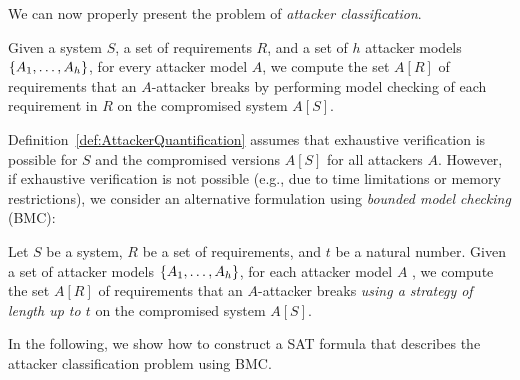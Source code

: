We can now properly present the problem of \emph{attacker classification}.
\begin{definition} 
\label{def:AttackerQuantification}
Given a system $S$, a set of requirements $R$, and a set of $h$ attacker models
$\left\{A_1, \ldots , A_h\right\}$, for every attacker model $A$, we compute the set $A[R]$ of requirements that an $A$-attacker breaks by performing model checking of each requirement in $R$ on the compromised system $A[S]$. 
\end{definition}

Definition~\ref{def:AttackerQuantification} assumes that exhaustive verification is possible for $S$ and the compromised versions $A[S]$ for all attackers $A$. However, if exhaustive verification is not possible (e.g., due to time limitations or memory restrictions), we consider an alternative formulation using \emph{bounded model checking} (BMC): 
\begin{definition} 
\label{def:BoundedModelCheckingOfSystems}
Let $S$ be a system, $R$ be a set of requirements, and $t$ be a natural number. Given a set of attacker models $\left\{A_1, \ldots , A_h\right\}$, for each attacker model $A$ , we compute the set $A[R]$ of requirements that an $A$-attacker breaks \emph{using a strategy of length up to $t$} on the compromised system $A[S]$. 
\end{definition}
In the following, we show how to construct a SAT formula that describes the attacker classification problem using BMC. 

